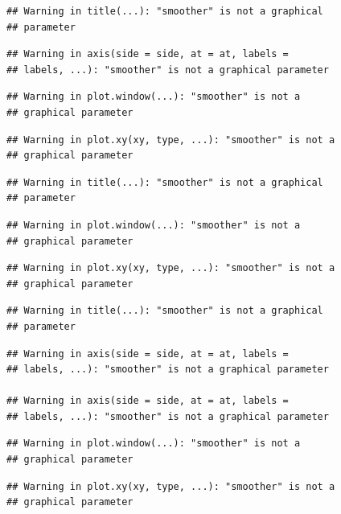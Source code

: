 \documentclass[12pt,]{krantz}
\begin{document}
\begin{verbatim}
## Warning in title(...): "smoother" is not a graphical
## parameter
\end{verbatim}

\begin{verbatim}
## Warning in axis(side = side, at = at, labels =
## labels, ...): "smoother" is not a graphical parameter
\end{verbatim}

\begin{verbatim}
## Warning in plot.window(...): "smoother" is not a
## graphical parameter
\end{verbatim}

\begin{verbatim}
## Warning in plot.xy(xy, type, ...): "smoother" is not a
## graphical parameter
\end{verbatim}

\begin{verbatim}
## Warning in title(...): "smoother" is not a graphical
## parameter
\end{verbatim}

\begin{verbatim}
## Warning in plot.window(...): "smoother" is not a
## graphical parameter
\end{verbatim}

\begin{verbatim}
## Warning in plot.xy(xy, type, ...): "smoother" is not a
## graphical parameter
\end{verbatim}

\begin{verbatim}
## Warning in title(...): "smoother" is not a graphical
## parameter
\end{verbatim}

\begin{verbatim}
## Warning in axis(side = side, at = at, labels =
## labels, ...): "smoother" is not a graphical parameter

## Warning in axis(side = side, at = at, labels =
## labels, ...): "smoother" is not a graphical parameter
\end{verbatim}

\begin{verbatim}
## Warning in plot.window(...): "smoother" is not a
## graphical parameter
\end{verbatim}

\begin{verbatim}
## Warning in plot.xy(xy, type, ...): "smoother" is not a
## graphical parameter
\end{verbatim}
\end{document}
